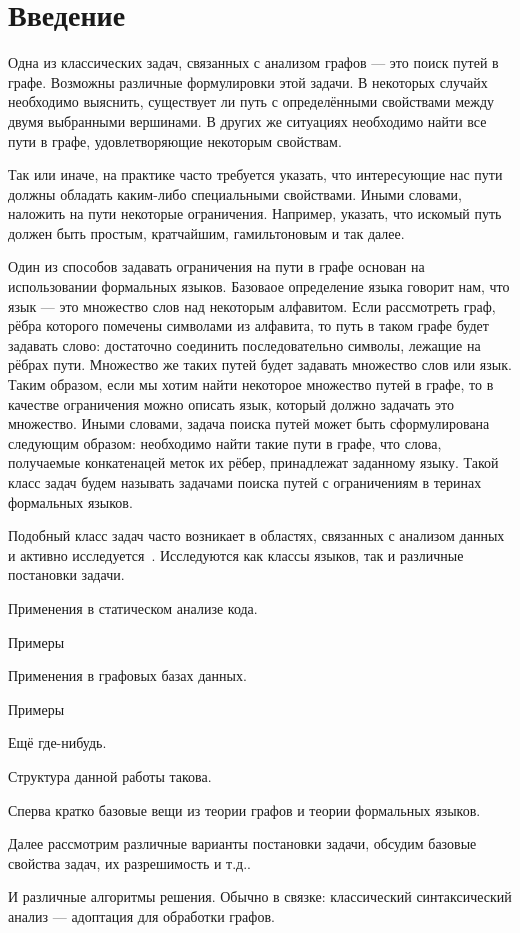 \chapter*{Введение}


Одна из классических задач, связанных с анализом графов --- это поиск путей в графе.
Возможны различные формулировки этой задачи.
В некоторых случайх необходимо выяснить, существует ли путь с определёнными свойствами между двумя выбранными вершинами.
В других же ситуациях необходимо найти все пути в графе, удовлетворяющие некоторым свойствам.

Так или иначе, на практике часто требуется указать, что интересующие нас пути должны обладать каким-либо специальными свойствами.
Иными словами, наложить на пути некоторые ограничения.
Например, указать, что искомый путь должен быть простым, кратчайшим, гамильтоновым и так далее.

Один из способов задавать ограничения на пути в графе основан на использовании формальных языков.
Базоваое определение языка говорит нам, что язык --- это множество слов над некоторым алфавитом.
Если рассмотреть граф, рёбра которого помечены символами из алфавита, то путь в таком графе будет задавать слово: достаточно соединить последовательно символы, лежащие на рёбрах пути.
Множество же таких путей будет задавать множество слов или язык.
Таким образом, если мы хотим найти некоторое множество путей в графе, то в качестве ограничения можно описать язык, который должно задачать это множество.
Иными словами, задача поиска путей может быть сформулирована следующим образом: необходимо найти такие пути в графе, что слова, получаемые конкатенацей меток их рёбер, принадлежат заданному языку.
Такой класс задач будем называть задачами поиска путей с ограничениям в теринах формальных языков.

Подобный класс задач часто возникает в областях, связанных с анализом данных и активно исследуется~\cite{doi:10.1137/S0097539798337716,axelsson2011formal,10.1007/978-3-642-22321-1_24,Ward:2010:CRL:1710158.1710234,barrett2007label,doi:10.1137/S0097539798337716}.
Исследуются как классы языков, так и различные постановки задачи.

Применения в статическом анализе кода.
\begin{example}
Примеры
\end{example}

Применения в графовых базах данных.
\begin{example}
Примеры
\end{example}

Ещё где-нибудь.

Структура данной работы такова.

Сперва кратко базовые вещи из теории графов и теории формальных языков.

Далее рассмотрим различные варианты постановки задачи, обсудим базовые свойства задач, их разрешимость и т.д..

И различные алгоритмы решения.
Обычно в связке: классический синтаксический анализ --- адоптация для обработки графов.


